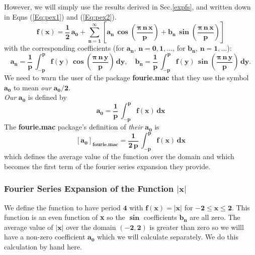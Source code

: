 \documentclass[12pt]{article}
\begin{document}
\noindent However, we will simply use the results derived in Sec.\ref{expfs}, and written down
  in Eqns (\ref{Eq:pex1}) and (\ref{Eq:pex2}).
\begin{equation}  \label{pfexpan}
\mathbf{f(x) = \frac{1}{2} \, a_{0} + \sum_{n=1}^{\infty} \left[ 
   a_{n}\,\boldsymbol{\cos} \left( \frac{ \boldsymbol{\pi}\,n\,x}{p} \right) +
   b_{n} \,\boldsymbol{\sin} \left( \frac{ \boldsymbol{\pi}\,n\,x}{p} \right) \right] }
\end{equation}
with the corresponding coefficients (for $\mathbf{a_{n}}$, $\mathbf{n = 0, 1, ...}$,
  for $\mathbf{b_{n}}$, $\mathbf{n = 1, ...}$):
\begin{equation} \label{pfcoeff}
\mathbf{ a_{n} = \frac{1}{p} \, \int_{-p}^{p} f(y)\,
   \boldsymbol{\cos} \left( \frac{ \boldsymbol{\pi}\,n\,y}{p} \right) \, dy}, \quad
   \mathbf{ b_{n} = \frac{1}{p} \, \int_{-p}^{p} f(y)\,
   \boldsymbol{\sin} \left( \frac{ \boldsymbol{\pi}\,n\,y}{p} \right) \, dy}. 
\end{equation}
We need to warn the user of the package \textbf{fourie.mac} that they use the
  symbol $\mathbf{a_{0}}$ to mean \textit{our} $\mathbf{a_{0}/2}$.  \\
  
\noindent \textit{Our} $\mathbf{a_{0}}$ is defined by
\begin{equation}
\mathbf{ a_{0} = \frac{1}{p} \, \int_{-p}^{p} f(x)\,dx }
\end{equation}
The \textbf{fourie.mac} package's definition of \textit{their} $\mathbf{a_{0}}$ is
\begin{equation} \label{fa0}
\mathbf{ [a_0]_{fourie.mac} = \frac{1}{2\,p} \, \int_{-p}^{p} f(x)\,dx }
\end{equation}
 which defines the average value of the function over the domain
 and which becomes the first term of the fourier series expansion they provide.
\subsubsection{Fourier Series Expansion of the Function $\mathbf{\vert x \vert}$ }
We define the function to have period $\mathbf{4}$ with 
  $\mathbf{f(x) = \vert x \vert}$ for $\mathbf{-2 \leq x \leq 2}$.   
This function  is an even function of \textbf{x} so the $\boldsymbol{\sin}$
  coefficients $\mathbf{b_{n}}$ are all zero.
The average value of $\mathbf{\vert x \vert}$ over the domain $\mathbf{(-2,2)}$
 is greater than zero  so we willl have a non-zero coefficient $\mathbf{a_{0}}$
 which we will calculate separately. We do this calculation by hand here.\\
 
\end{document}
